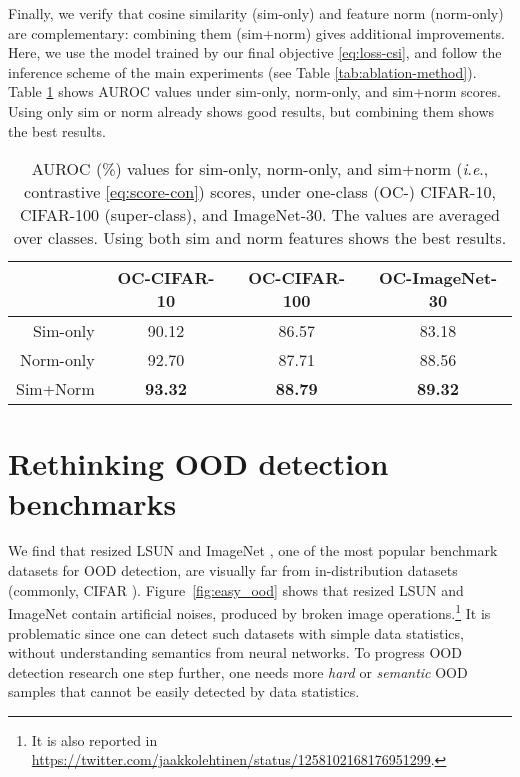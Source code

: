 \documentclass{article}
\newcommand{\ie}{\textit{i}.\textit{e}.}
\begin{document}
 

Finally, we verify that cosine similarity (sim-only) and feature norm (norm-only) are complementary: combining them (sim+norm) gives additional improvements. Here, we use the model trained by our final objective \eqref{eq:loss-csi}, and follow the inference scheme of the main experiments (see Table \ref{tab:ablation-method}). Table \ref{tab:sim_norm} shows AUROC values under sim-only, norm-only, and sim+norm scores. Using only sim or norm already shows good results, but combining them shows the best results.


\begin{table}[h]
\centering\small
\caption{
AUROC (\%) values for sim-only, norm-only, and sim+norm (\ie, contrastive \eqref{eq:score-con}) scores, under one-class (OC-) CIFAR-10, CIFAR-100 (super-class), and ImageNet-30. The values are averaged over classes. Using both sim and norm features shows the best results.
}\label{tab:sim_norm}
\begin{tabular}{rccc}
\toprule
& OC-CIFAR-10 & OC-CIFAR-100 & OC-ImageNet-30 \\
\midrule
Sim-only & 90.12 & 86.57 & 83.18 \\
Norm-only & 92.70 & 87.71 & 88.56 \\
Sim+Norm & \textbf{93.32} & \textbf{88.79} & \textbf{89.32} \\
\bottomrule
\end{tabular}
\end{table}
 
 
\clearpage
\section{Rethinking OOD detection benchmarks}
\label{appx:hard_ood}

We find that resized LSUN and ImageNet \citep{liang2018enhancing}, one of the most popular benchmark datasets for OOD detection, are visually far from in-distribution datasets (commonly, CIFAR \citep{krizhevsky2009learning}). Figure~\ref{fig:easy_ood} shows that resized LSUN and ImageNet contain artificial noises, produced by broken image operations.\footnote{It is also reported in \url{https://twitter.com/jaakkolehtinen/status/1258102168176951299}.} It is problematic since one can detect such datasets with simple data statistics, without understanding semantics from neural networks. To progress OOD detection research one step further, one needs more \textit{hard} or \textit{semantic} OOD samples that cannot be easily detected by data statistics.
\end{document}
